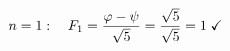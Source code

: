 \documentclass[preview]{standalone}
\begin{document}
\begin{align*}
\special{dvisvgm:raw <g id='unique000'>}n = 1: \quad F_1 = \frac{\varphi - \psi}{\sqrt{5}}= \frac{\sqrt{5}}{\sqrt{5}} = 1 \;\checkmark\special{dvisvgm:raw </g>}
\end{align*}
\end{document}
